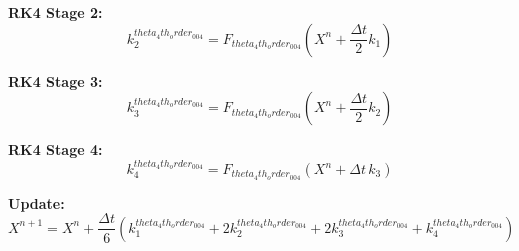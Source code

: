 \documentclass{article}
\begin{document}
\textbf{RK4 Stage 2:}
\[
k_2^{theta_4th_order_004} = F_{theta_4th_order_004}\left(X^n + \frac{\Delta t}{2} k_1\right)
\]

\textbf{RK4 Stage 3:}
\[
k_3^{theta_4th_order_004} = F_{theta_4th_order_004}\left(X^n + \frac{\Delta t}{2} k_2\right)
\]

\textbf{RK4 Stage 4:}
\[
k_4^{theta_4th_order_004} = F_{theta_4th_order_004}\left(X^n + \Delta t \, k_3\right)
\]

\textbf{Update:}
\[
X^{n+1} = X^n + \frac{\Delta t}{6} \left(k_1^{theta_4th_order_004} + 2k_2^{theta_4th_order_004} + 2k_3^{theta_4th_order_004} + k_4^{theta_4th_order_004}\right)
\]
\end{document}
